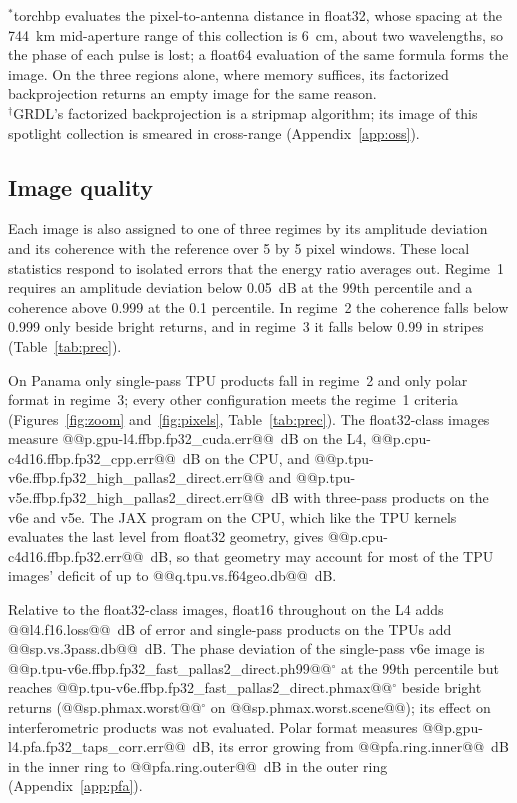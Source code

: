 \documentclass[11pt]{article}
\begin{document}
\begin{table}[tb]
\smallskip
\begin{minipage}{0.92\textwidth}\footnotesize
$^*$torchbp evaluates the pixel-to-antenna distance in float32, whose spacing at the 744~km mid-aperture range of this collection is 6~cm, about two wavelengths, so the phase of each pulse is lost; a float64 evaluation of the same formula forms the image. On the three regions alone, where memory suffices, its factorized backprojection returns an empty image for the same reason.\\
$^\dagger$GRDL's factorized backprojection is a stripmap algorithm; its image of this spotlight collection is smeared in cross-range (Appendix~\ref{app:oss}).
\end{minipage}
\end{table}

\subsection{Image quality}
\label{sec:quality}

Each image is also assigned to one of three regimes by its amplitude deviation and its coherence with the reference over 5 by 5 pixel windows. These local statistics respond to isolated errors that the energy ratio averages out. Regime~1 requires an amplitude deviation below 0.05~dB at the 99th percentile and a coherence above 0.999 at the 0.1 percentile. In regime~2 the coherence falls below 0.999 only beside bright returns, and in regime~3 it falls below 0.99 in stripes (Table~\ref{tab:prec}).

On Panama only single-pass TPU products fall in regime~2 and only polar format in regime~3; every other configuration meets the regime~1 criteria (Figures~\ref{fig:zoom} and~\ref{fig:pixels}, Table~\ref{tab:prec}). The float32-class images measure @@p.gpu-l4.ffbp.fp32_cuda.err@@~dB on the L4, @@p.cpu-c4d16.ffbp.fp32_cpp.err@@~dB on the CPU, and @@p.tpu-v6e.ffbp.fp32_high_pallas2_direct.err@@ and @@p.tpu-v5e.ffbp.fp32_high_pallas2_direct.err@@~dB with three-pass products on the v6e and v5e. The JAX program on the CPU, which like the TPU kernels evaluates the last level from float32 geometry, gives @@p.cpu-c4d16.ffbp.fp32.err@@~dB, so that geometry may account for most of the TPU images' deficit of up to @@q.tpu.vs.f64geo.db@@~dB.

Relative to the float32-class images, float16 throughout on the L4 adds @@l4.f16.loss@@~dB of error and single-pass products on the TPUs add @@sp.vs.3pass.db@@~dB. The phase deviation of the single-pass v6e image is @@p.tpu-v6e.ffbp.fp32_fast_pallas2_direct.ph99@@$^\circ$ at the 99th percentile but reaches @@p.tpu-v6e.ffbp.fp32_fast_pallas2_direct.phmax@@$^\circ$ beside bright returns (@@sp.phmax.worst@@$^\circ$ on @@sp.phmax.worst.scene@@); its effect on interferometric products was not evaluated. Polar format measures @@p.gpu-l4.pfa.fp32_taps_corr.err@@~dB, its error growing from @@pfa.ring.inner@@~dB in the inner ring to @@pfa.ring.outer@@~dB in the outer ring (Appendix~\ref{app:pfa}).
\end{document}
